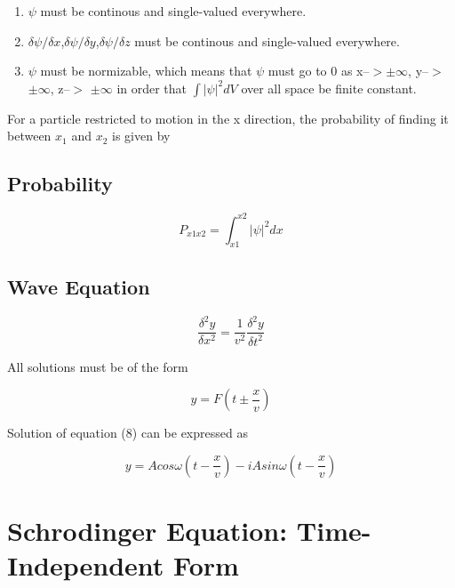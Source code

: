 \documentclass{article}
\begin{document}
\begin{enumerate}
    \item $\psi$ must be continous and single-valued everywhere.
    \item $\delta\psi/\delta x$,$\delta\psi/\delta y$,$\delta\psi/\delta z$ must be continous and single-valued everywhere.
    \item $\psi$ must be normizable, which means that $\psi$ must go to 0 as x--$>$$\pm\infty$, y--$>$ $\pm\infty$, z--$>$ $\pm\infty$ in order that $\int |\psi|^2 dV$ over all space be finite constant.
    

\end{enumerate}



For a particle restricted to motion in the x direction, the probability of finding it between $x_1$ and $x_2$ is given by

\subsection{Probability}

\begin{equation}
    P_{{x1}{x2}}=\int_{x1}^{x2}|\psi|^2dx
\end{equation}

\subsection{Wave Equation}

\begin{equation}
    \frac{\delta^2y}{\delta x^2}=\frac{1}{v^2}\frac{\delta^2y}{\delta t^2}
\end{equation}

All solutions must be of the form

\begin{equation}
    y=F(t\pm\frac{x}{v})
\end{equation}

Solution of equation (8) can be expressed as 

\begin{equation}
    y=Acos\omega(t-\frac{x}{v})-iAsin\omega(t-\frac{x}{v})
\end{equation}


\section{Schrodinger Equation: Time-Independent Form}  
\end{document}
